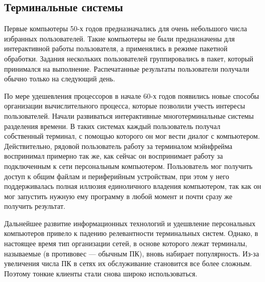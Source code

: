 \subsection{Терминальные системы}
Первые компьютеры 50-х годов предназначались для очень небольшого числа избранных
пользователей. Такие компьютеры не были предназначены для интерактивной работы
пользователя, а применялись в режиме пакетной обработки.  Задания нескольких
пользователей группировались в пакет, который принимался на выполнение. Распечатанные
результаты пользователи получали обычно только на следующий день.

По мере удешевления процессоров в начале 60-х годов появились новые способы организации
вычислительного процесса, которые позволили учесть интересы пользователей.  Начали
развиваться интерактивные многотерминальные системы разделения времени.  В таких
системах каждый пользователь получал собственный терминал, с помощью которого он мог
вести диалог с компьютером.
Действительно, рядовой пользователь работу за терминалом мэйнфрейма воспринимал примерно
так же, как сейчас он воспринимает работу за подключенным к сети персональным
компьютером. Пользователь мог получить доступ к общим файлам и периферийным устройствам,
при этом у него поддерживалась полная иллюзия единоличного владения компьютером, так как
он мог запустить нужную ему программу в любой момент и почти сразу же получить
результат. \cite{olifer}

Дальнейшее развитие информационных технологий и удешвление персональных компьютеров
привело к падению релевантности терминальных систем. Однако, в настоящее время тип
организации сетей, в основе которого лежат терминалы, называемые 
(в противовес  — обычным ПК), вновь набирает популярность. Из-за
увеличения числа ПК в сетях их обслуживание становится все более сложным. Поэтому тонкие
клиенты стали снова широко использоваться.
